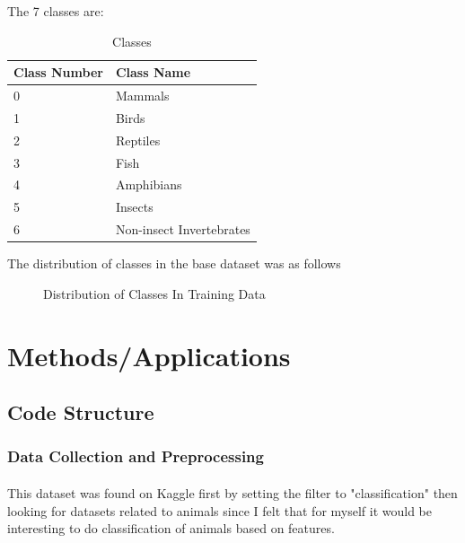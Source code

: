 \documentclass{article}
\begin{document}
    The 7 classes are: 
    \begin{table}[H]
      \caption{Classes}
      \label{class-table}
      \centering
      \begin{tabular}{ll}
        \cmidrule(r){1-2}
        Class Number     & Class Name      \\
        \midrule
        0   & Mammals   \\
        1   & Birds   \\
        2   & Reptiles   \\
        3   & Fish   \\
        4   & Amphibians   \\
        5   & Insects  \\
        6   & Non-insect Invertebrates  \\
        \bottomrule
      \end{tabular}
    \end{table}

    The distribution of classes in the base dataset was as follows
    \begin{figure}[H]
      \centering
      \caption{Distribution of Classes In Training Data}
    \end{figure}

\section{Methods/Applications}
\subsection{Code Structure}
\subsubsection{Data Collection and Preprocessing}
\paragraph{}
    This dataset was found on Kaggle first by setting the filter to "classification" then looking for datasets related to animals since I felt that for myself it would be interesting to do classification of animals based on features. 
    
\end{document}
